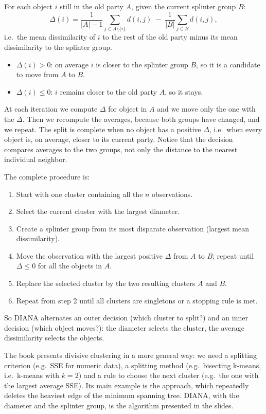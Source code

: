 \begin{definition}
For each object $i$ still in the old party $A$, given the current splinter group $B$:
\[
  \Delta(i) = \frac{1}{|A| - 1} \sum_{j \in A \setminus \{i\}} d(i,j) \;-\; \frac{1}{|B|} \sum_{j \in B} d(i,j),
\]
i.e.\ the mean dissimilarity of $i$ to the rest of the old party minus its mean dissimilarity to the splinter group.
\end{definition}

\begin{itemize}
  \item $\Delta(i) > 0$: on average $i$ is closer to the splinter group $B$, so it is a candidate to move from $A$ to $B$.
  \item $\Delta(i) \le 0$: $i$ remains closer to the old party $A$, so it stays.
\end{itemize}
At each iteration we compute $\Delta$ for  object in $A$ and we move only the one with the  $\Delta$. Then we recompute the averages, because both groups have changed, and we repeat. The split is complete when no object has a positive $\Delta$, i.e.\ when every object is, on average, closer to its current party. Notice that the decision compares averages to the two groups, not only the distance to the nearest individual neighbor.

The complete procedure is:
\begin{enumerate}
  \item Start with one cluster containing all the $n$ observations.
  \item Select the current cluster with the largest diameter.
  \item Create a splinter group from its most disparate observation (largest mean dissimilarity).
  \item Move the observation with the largest positive $\Delta$ from $A$ to $B$; repeat until $\Delta \le 0$ for all the objects in $A$.
  \item Replace the selected cluster by the two resulting clusters $A$ and $B$.
  \item Repeat from step 2 until all clusters are singletons or a stopping rule is met.
\end{enumerate}
So DIANA alternates an outer decision (which cluster to split?) and an inner decision (which object moves?): the diameter selects the cluster, the average dissimilarity selects the objects.

\begin{remark}
The book presents divisive clustering in a more general way: we need a splitting criterion (e.g.\ SSE for numeric data), a splitting method (e.g.\ bisecting k-means, i.e.\ k-means with $k = 2$) and a rule to choose the next cluster (e.g.\ the one with the largest average SSE). Its main example is the  approach, which repeatedly deletes the heaviest edge of the minimum spanning tree. DIANA, with the diameter and the splinter group, is the algorithm presented in the slides.
\end{remark}

